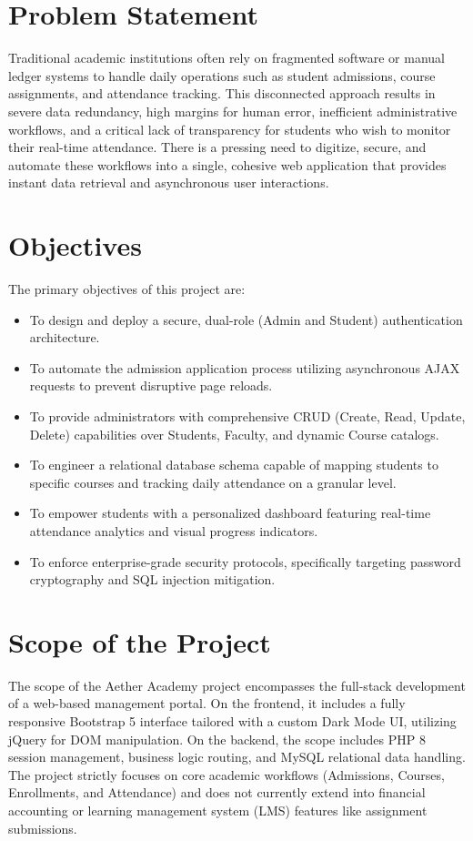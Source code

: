 \documentclass[12pt, a4paper]{report}
\begin{document}
\section{Problem Statement}
Traditional academic institutions often rely on fragmented software or manual ledger systems to handle daily operations such as student admissions, course assignments, and attendance tracking. This disconnected approach results in severe data redundancy, high margins for human error, inefficient administrative workflows, and a critical lack of transparency for students who wish to monitor their real-time attendance. There is a pressing need to digitize, secure, and automate these workflows into a single, cohesive web application that provides instant data retrieval and asynchronous user interactions.

\section{Objectives}
The primary objectives of this project are:
\begin{itemize}
    \item To design and deploy a secure, dual-role (Admin and Student) authentication architecture.
    \item To automate the admission application process utilizing asynchronous AJAX requests to prevent disruptive page reloads.
    \item To provide administrators with comprehensive CRUD (Create, Read, Update, Delete) capabilities over Students, Faculty, and dynamic Course catalogs.
    \item To engineer a relational database schema capable of mapping students to specific courses and tracking daily attendance on a granular level.
    \item To empower students with a personalized dashboard featuring real-time attendance analytics and visual progress indicators.
    \item To enforce enterprise-grade security protocols, specifically targeting password cryptography and SQL injection mitigation.
\end{itemize}

\section{Scope of the Project}
The scope of the Aether Academy project encompasses the full-stack development of a web-based management portal. On the frontend, it includes a fully responsive Bootstrap 5 interface tailored with a custom Dark Mode UI, utilizing jQuery for DOM manipulation. On the backend, the scope includes PHP 8 session management, business logic routing, and MySQL relational data handling. The project strictly focuses on core academic workflows (Admissions, Courses, Enrollments, and Attendance) and does not currently extend into financial accounting or learning management system (LMS) features like assignment submissions.
\end{document}
